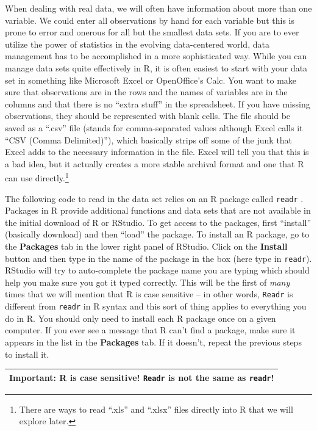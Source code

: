 \documentclass[]{book}
\let\rmarkdownfootnote\footnote%
\def\footnote{\protect\rmarkdownfootnote}
\renewcommand{\indent}{\hspace{15pt}}
\begin{document}
\indent When dealing with real data, we will often have information about more than one
variable. We could enter all observations by hand for each variable but this is
prone to error and onerous for all but the smallest data sets. If you are to
ever utilize the power of statistics in the evolving data-centered world, data
management has to be accomplished in a more sophisticated way. While you can
manage data sets quite effectively in R, it is often easiest to start with your
data set in something like Microsoft Excel or OpenOffice's Calc. You want to
make sure that observations are in the rows and the names of variables are in
the columns and that there is no ``extra stuff'' in the spreadsheet. If you have
missing observations, they should be represented with blank cells. The file should
be saved as a ``.csv'' file (stands for comma-separated values although Excel
calls it ``CSV (Comma Delimited)''), which basically strips off some of the junk
that Excel adds to the necessary information in the file. Excel will tell you that
this is a bad idea, but it actually creates a more stable archival format and
one that R can use directly.\footnote{There are ways to read ``.xls'' and ``.xlsx'' files
  directly into R that we will explore later.}

\indent The following code to read in the data set relies on an R package called
\texttt{readr} \citep{R-readr}. Packages in R provide additional functions and data sets that
are not available in the initial download of R or RStudio. To get access to the packages,
first ``install'' (basically
download) and then ``load'' the package. To install an R package, go to the \textbf{Packages}
tab in the lower right panel of
RStudio. Click on the \textbf{Install} button and then type in the name of the package in
the box (here type in \texttt{readr}).
RStudio will try to auto-complete the package name
you are typing which should help you make sure you got it typed correctly. This will
be the first of \emph{many} times that we will mention that R is case sensitive -- in
other words, \texttt{Readr} is different from \texttt{readr} in R syntax and this sort of
thing applies to everything you do in R. You should only need to install each R
package once on a given computer. If you ever see a message that R can't find a
package, make sure it appears in the list in the \textbf{Packages} tab. If it
doesn't, repeat the previous steps to install it.

\begin{longtable}[]{@{}l@{}}
\toprule
\endhead
\textbf{Important}: R is case sensitive! \texttt{Readr} is not the same as \texttt{readr}!\tabularnewline
\bottomrule
\end{longtable}
\end{document}
